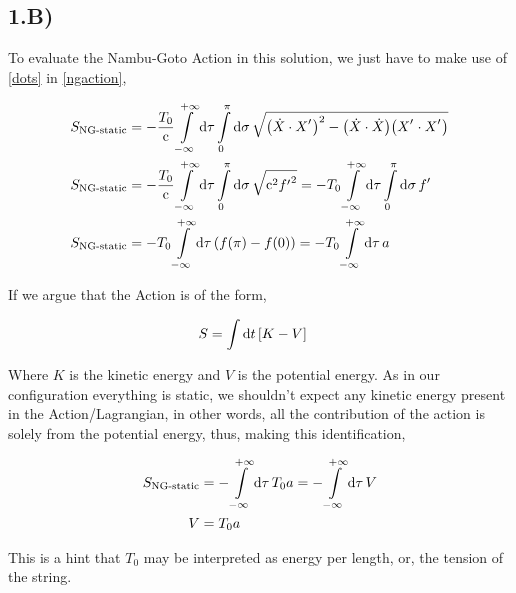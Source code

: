 \subsection{1.B)}

To evaluate the Nambu-Goto Action in this solution, we just have to make use of \ref{dots} in \ref{ngaction},

\begin{align*}
    S_{\textnormal{NG-static}}&=-\frac{T_0}{\luz}\int\limits_{-\infty}^{+\infty}\dd{\tau}\int\limits_0^\pi\dd{\sigma}\sqrt{\qty(\dot X\cdot X^\sidev)^2- \qty(\dot X\cdot \dot X)\qty(X^\sidev\cdot X^\sidev) }\\
    S_{\textnormal{NG-static}}&=-\frac{T_0}{\luz}\int\limits_{-\infty}^{+\infty}\dd{\tau}\int\limits_0^\pi\dd{\sigma}\sqrt{\luz^2{f'}^2}=-T_0\int\limits_{-\infty}^{+\infty}\dd{\tau}\int\limits_0^\pi\dd{\sigma}f'\\
    S_{\textnormal{NG-static}}&=-T_0\int\limits_{-\infty}^{+\infty}\dd{\tau}\qty(f\qty(\pi)-f(0))=-T_0\int\limits_{-\infty}^{+\infty}\dd{\tau}a
\end{align*}

If we argue that the Action is of the form,

\begin{align*}
    S&=\int\dd{t}\qty[K-V]
\end{align*}

Where $K$ is the kinetic energy and $V$ is the potential energy. As in our configuration everything is static, we shouldn't expect any kinetic energy present in the Action/Lagrangian, in other words, all the contribution of the action is solely from 
the potential energy, thus, making this identification,

\begin{align*}
    S_{\textnormal{NG-static}}&=-\int\limits_{-\infty}^{+\infty}\dd{\tau}T_0a=-\int\limits_{-\infty}^{+\infty}\dd{\tau}V\\
    V&=T_0a
\end{align*}

This is a hint that $T_0$ may be interpreted as energy per length, or, the tension of the string.